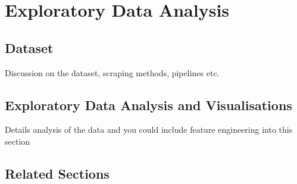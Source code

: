 \chapter{Exploratory Data Analysis}

\section{Dataset}
Discussion on the dataset, scraping methods, pipelines etc.
\section{Exploratory Data Analysis and Visualisations}
Details analysis of the data and you could include feature engineering into this section
\section{Related Sections}